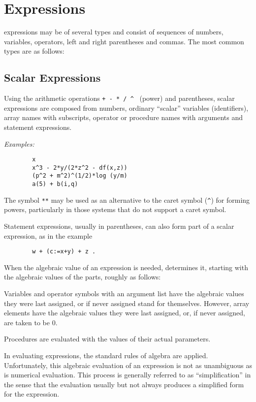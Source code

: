 \chapter{Expressions}

{\REDUCE} expressions may be of several types and consist
of sequences of numbers, variables, operators, left and right parentheses
and commas.  The most common types are as follows:

\section{Scalar Expressions}

Using the arithmetic operations \texttt{+ - * / \textasciicircum}\
%
%
%
%
%
(power) and parentheses, scalar expressions are composed from numbers,
ordinary ``scalar'' variables (identifiers), array names with subscripts,
operator or procedure names with arguments and statement expressions.

\textit{Examples:}
\begin{verbatim}
        x
        x^3 - 2*y/(2*z^2 - df(x,z))
        (p^2 + m^2)^(1/2)*log (y/m)
        a(5) + b(i,q)
\end{verbatim}
The symbol \texttt{**} may be used as an alternative to the caret symbol
\ttindextype{** (expt)}{operator}%
(\texttt{\textasciicircum})
for forming powers, particularly in those systems that do not support a
caret symbol.

Statement expressions, usually in parentheses, can also form part of
a scalar\index{Scalar} expression, as in the example
\begin{verbatim}
        w + (c:=x+y) + z .
\end{verbatim}
When the algebraic value of an expression is needed, {\REDUCE} determines it,
starting with the algebraic values of the parts, roughly as follows:

Variables and operator symbols with an argument list have the algebraic
values they were last assigned, or if never assigned stand for themselves.
However, array elements have the algebraic values they were last assigned,
or, if never assigned, are taken to be 0.

Procedures are evaluated with the values of their actual parameters.

In evaluating expressions, the standard rules of algebra are applied.
Unfortunately, this algebraic evaluation of an expression is not as
unambiguous as is numerical evaluation. This process is generally referred
to as ``simplification''\index{Simplification} in the sense that the
evaluation usually but not always produces a simplified form for the
expression.

